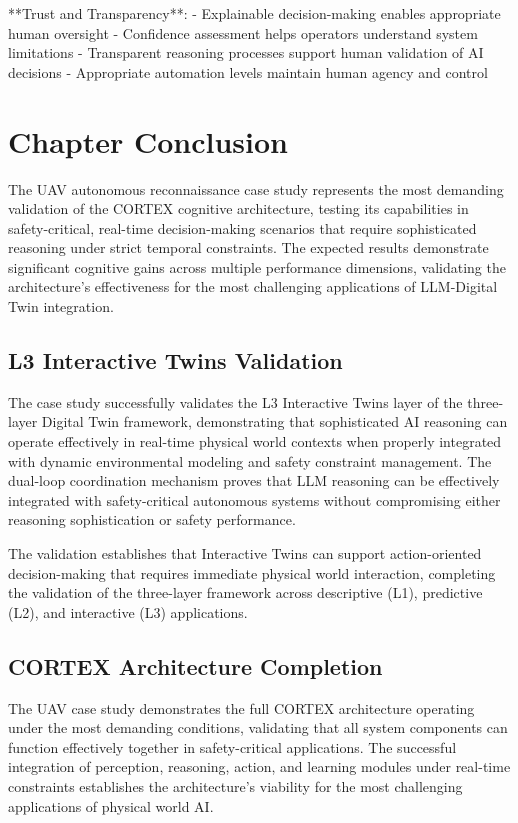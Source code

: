 **Trust and Transparency**:
- Explainable decision-making enables appropriate human oversight
- Confidence assessment helps operators understand system limitations
- Transparent reasoning processes support human validation of AI decisions
- Appropriate automation levels maintain human agency and control

\section{Chapter Conclusion}

The UAV autonomous reconnaissance case study represents the most demanding validation of the CORTEX cognitive architecture, testing its capabilities in safety-critical, real-time decision-making scenarios that require sophisticated reasoning under strict temporal constraints. The expected results demonstrate significant cognitive gains across multiple performance dimensions, validating the architecture's effectiveness for the most challenging applications of LLM-Digital Twin integration.

\subsection{L3 Interactive Twins Validation}

The case study successfully validates the L3 Interactive Twins layer of the three-layer Digital Twin framework, demonstrating that sophisticated AI reasoning can operate effectively in real-time physical world contexts when properly integrated with dynamic environmental modeling and safety constraint management. The dual-loop coordination mechanism proves that LLM reasoning can be effectively integrated with safety-critical autonomous systems without compromising either reasoning sophistication or safety performance.

The validation establishes that Interactive Twins can support action-oriented decision-making that requires immediate physical world interaction, completing the validation of the three-layer framework across descriptive (L1), predictive (L2), and interactive (L3) applications.

\subsection{CORTEX Architecture Completion}

The UAV case study demonstrates the full CORTEX architecture operating under the most demanding conditions, validating that all system components can function effectively together in safety-critical applications. The successful integration of perception, reasoning, action, and learning modules under real-time constraints establishes the architecture's viability for the most challenging applications of physical world AI.

